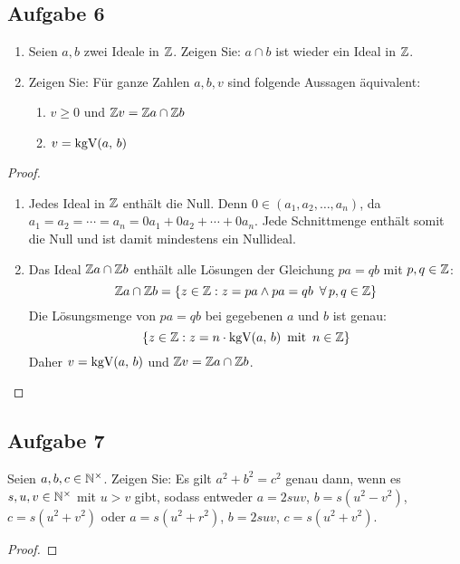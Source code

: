 \subsection{Aufgabe 6}
\begin{enumerate}[label=\alph*)]
  \item Seien $a,b$ zwei Ideale in $\mathbb{Z}{}$. Zeigen Sie:
        $a \cap b$ ist wieder ein Ideal in $\mathbb{Z}{}$.
  \item Zeigen Sie: Für ganze Zahlen $a,b,v$ sind folgende Aussagen äquivalent:
        \begin{enumerate}[label=\roman*)]
          \item $v \geq 0$ und
                $\mathbb{Z}{}v = \mathbb{Z}{}a \cap \mathbb{Z}{}b$
          \item $v = \text{kgV}(a,\,b)$
        \end{enumerate}
\end{enumerate}
\begin{proof}
  \begin{enumerate}[label=\alph*)]
    \item Jedes Ideal in $\mathbb{Z}{}$ enthält die Null.
          Denn $0 \in (a_1,a_2,\dotsc,a_n)$, da $a_1 = a_2 = \dotsb
            = a_n = 0a_1 + 0 a_2 + \dotsb + 0a_n$.
          Jede Schnittmenge enthält somit die Null und ist damit mindestens ein Nullideal.
    \item {} Das Ideal $\mathbb{Z}{}a \cap \mathbb{Z}{}b$ enthält
          alle Lösungen der Gleichung $pa = qb$ mit $p,q \in \mathbb{Z}{}$:
          \begin{equation*}
            \mathbb{Z}{}a \cap \mathbb{Z}{}b = \{z \in \mathbb{Z}{}: z = pa \wedge
            pa = qb \enspace\forall\,p,q \in \mathbb{Z}{}\}
          \end{equation*}
          Die Lösungsmenge von $pa = qb$ bei gegebenen $a$ und $b$ ist genau:
          \begin{equation*}
            \{z \in \mathbb{Z}{}: z = n \cdot \text{kgV}(a,\,b) \enspace \text{mit} \enspace n \in \mathbb{Z}{} \}
          \end{equation*}
          Daher $v = \text{kgV}(a,\,b)$ und $\mathbb{Z}{}v = \mathbb{Z}{}a \cap \mathbb{Z}{}b$.
  \end{enumerate}
\end{proof}

\subsection{Aufgabe 7}
Seien $a,b,c \in \mathbb{N}^\times{}$. Zeigen Sie: Es gilt $a^2 + b^2 = c^2$ genau dann,
wenn es $s,u,v \in \mathbb{N}^\times{}$ mit $u > v$ gibt, sodass entweder
$a = 2suv$, $b = s(u^2 - v^2)$, $c = s(u^2 + v^2)$ oder
$a = s(u^2 + r^2)$, $b = 2suv$, $c = s(u^2 + v^2)$.
\begin{proof}
\end{proof}
